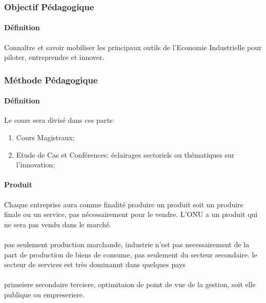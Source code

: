 \documentclass{article}
\begin{document}
\subsubsection{Objectif Pédagogique}
\paragraph{Définition}Connaître et savoir mobiliser les principaux outils de l'Economie Industrielle pour piloter, entreprendre et innover.

\subsubsection{Méthode Pédagogique}
\paragraph{Définition}Le cours sera divisé dans ces parts:
\begin{enumerate}[noitemsep]
    \item Cours Magistraux;
    \item Etude de Cas et Conférences: éclairages sectoriels ou thématiques sur l'innovation;
\end{enumerate}

\paragraph{Produit}Chaque entreprise aura comme finalité produire un produit soit un produire finale ou un service, pas nécessairement pour le vendre. L'ONU a un produit qui ne sera pas vendu dans le marché.


\paragraph{}pas seulement production marchande, industrie n'est pas necessairement de la part de production de biens de consume, pas seulement du secteur secondaire. le secteur de services est très dominannt dans quelques pays


\paragraph{}primeiere secondaire terciere, optimitaion de point de vue de la gestion, soit elle publique ou empreseriere.
\end{document}
